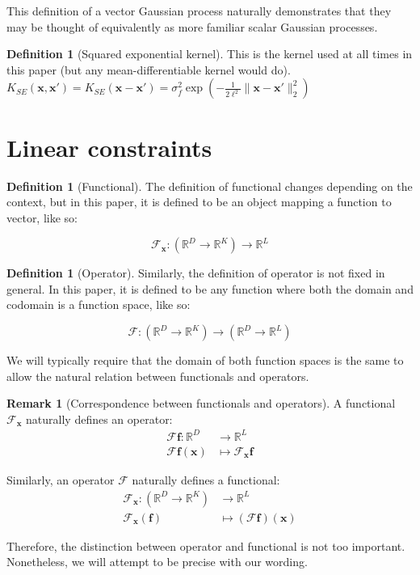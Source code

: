\documentclass[12pt,a4paper,twoside]{report}
\theoremstyle{definition}
\newtheorem{remark}[thm]{Remark}
\newtheorem{definition}[thm]{Definition}
\newcommand{\f}{\mathscr F_\mathbf x}
\begin{document}
This definition of a vector Gaussian process naturally demonstrates that they may be thought of equivalently as more familiar scalar Gaussian processes.

\begin{definition}[Squared exponential kernel]\label{SE}
	This is the kernel used at all times in this paper (but any mean-differentiable kernel would do).
$K_{SE}(\mathbf x,\mathbf x') = K_{SE}(\mathbf x - \mathbf x') = \sigma^2_f \exp\left(-\frac{1}{2\ell^2}\|\mathbf x-\mathbf x'\|_2^2\right)$

\end{definition}

\section{Linear constraints}
\begin{definition}[Functional]
	The definition of functional changes depending on the context, but in this paper, it is defined to be an object mapping a function to vector, like so:

$$\mathscr F_\mathbf x: (\mathbb{R}^D\to\mathbb{R}^K)\to\mathbb{R}^L$$
\end{definition}

\begin{definition}[Operator]
	Similarly, the definition of operator is not fixed in general. In this paper, it is defined to be any function where both the domain and codomain is a function space, like so:

$$\mathscr F: (\mathbb{R}^D\to\mathbb{R}^K)\to(\mathbb{R}^D\to\mathbb{R}^L)$$

We will typically require that the domain of both function spaces is the same to allow the natural relation between functionals and operators.
\end{definition}

\begin{remark}[Correspondence between functionals and operators]\label{remark}
	A functional $\f$ naturally defines an operator:
	\begin{align*}
		\mathscr F \mathbf f:\mathbb{R}^D&\to\mathbb{R}^L\\
		\mathscr F \mathbf f(\mathbf x)&\mapsto\f \mathbf f
	\end{align*}

	Similarly, an operator $\mathscr F$ naturally defines a functional:
	\begin{align*}
		\mathscr F_\mathbf x:(\mathbb{R}^D\to\mathbb{R}^K)&\to \mathbb{R}^L\\
		\mathscr F_\mathbf x(\mathbf f)&\mapsto (\mathscr F \mathbf f)(\mathbf x)
	\end{align*}

	Therefore, the distinction between operator and functional is not too important. Nonetheless, we will attempt to be precise with our wording.
\end{remark}
\end{document}
